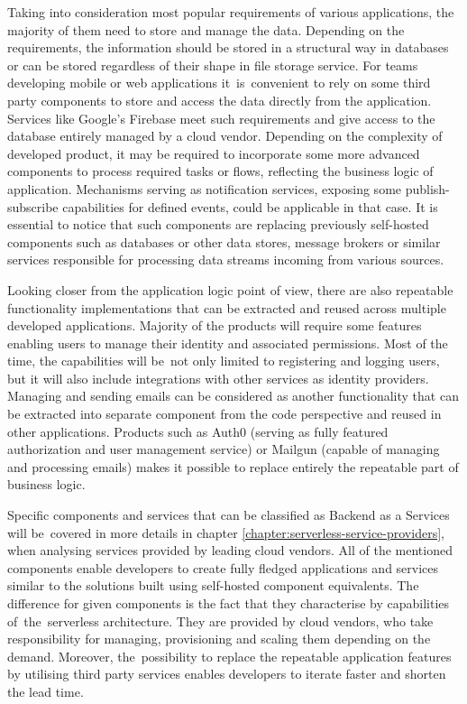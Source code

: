 Taking into consideration most popular requirements of various applications, the majority of them need to store and manage the data. Depending on the requirements, the information should be stored in a structural way in databases or can be stored regardless of their shape in file storage service. For teams developing mobile or web applications it~is~convenient to rely on some third party components to store and access the data directly from the application. Services like Google's Firebase meet such requirements and give access to the database entirely managed by a cloud vendor. Depending on the complexity of developed product, it may be required to incorporate some more advanced components to process required tasks or flows, reflecting the business logic of application. Mechanisms serving as notification services, exposing some publish-subscribe capabilities for defined events, could be applicable in that case. It is essential to notice that such components are replacing previously self-hosted components such as databases or other data stores, message brokers or similar services responsible for processing data streams incoming from various sources.

Looking closer from the application logic point of view, there are also repeatable functionality implementations that can be extracted and reused across multiple developed applications. Majority of the products will require some features enabling users to manage their identity and associated permissions. Most of the time, the capabilities will be~not only limited to registering and logging users, but it will also include integrations with other services as identity providers. Managing and sending emails can be considered as another functionality that can be extracted into separate component from the code perspective and reused in other applications. Products such as Auth0 (serving as fully featured authorization and user management service) or Mailgun (capable of managing and processing emails) makes it possible to replace entirely the repeatable part of business logic.

Specific components and services that can be classified as Backend as a Services will be~covered in more details in chapter \ref{chapter:serverless-service-providers}, when analysing services provided by leading cloud vendors. All of the mentioned components enable developers to create fully fledged applications and services similar to the solutions built using self-hosted component equivalents. The difference for given components is the fact that they characterise by capabilities of~the~serverless architecture. They are provided by cloud vendors, who take responsibility for managing, provisioning and scaling them depending on the demand. Moreover, the~possibility to replace the repeatable application features by utilising third party services enables developers to iterate faster and shorten the lead time.


